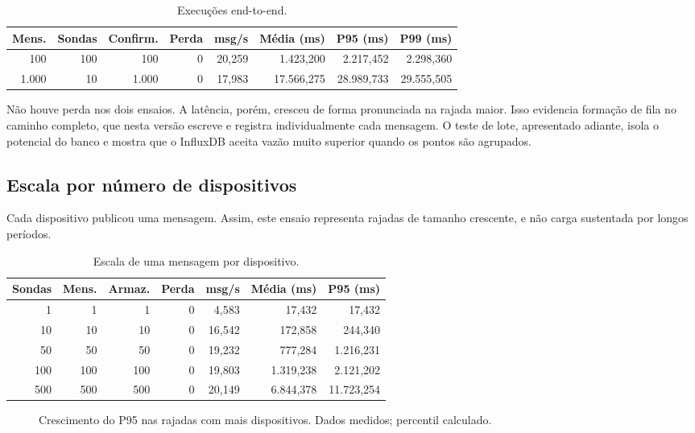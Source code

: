 \documentclass[12pt,a4paper]{article}
\begin{document}
\begin{table}[htbp]
\centering
\caption{Execuções end-to-end.}
\begin{tabular}{rrrrrrrr}
\toprule
Mens. & Sondas & Confirm. & Perda & msg/s & Média (ms) & P95 (ms) & P99 (ms) \\
\midrule
100 & 100 & 100 & 0 & 20,259 & 1.423,200 & 2.217,452 & 2.298,360 \\
1.000 & 10 & 1.000 & 0 & 17,983 & 17.566,275 & 28.989,733 & 29.555,505 \\
\bottomrule
\end{tabular}
\end{table}

Não houve perda nos dois ensaios. A latência, porém, cresceu de forma pronunciada na rajada maior. Isso evidencia formação de fila no caminho completo, que nesta versão escreve e registra individualmente cada mensagem. O teste de lote, apresentado adiante, isola o potencial do banco e mostra que o InfluxDB aceita vazão muito superior quando os pontos são agrupados.

\subsection{Escala por número de dispositivos}

Cada dispositivo publicou uma mensagem. Assim, este ensaio representa rajadas de tamanho crescente, e não carga sustentada por longos períodos.

\begin{table}[htbp]
\centering
\caption{Escala de uma mensagem por dispositivo.}
\begin{tabular}{rrrrrrr}
\toprule
Sondas & Mens. & Armaz. & Perda & msg/s & Média (ms) & P95 (ms) \\
\midrule
1 & 1 & 1 & 0 & 4,583 & 17,432 & 17,432 \\
10 & 10 & 10 & 0 & 16,542 & 172,858 & 244,340 \\
50 & 50 & 50 & 0 & 19,232 & 777,284 & 1.216,231 \\
100 & 100 & 100 & 0 & 19,803 & 1.319,238 & 2.121,202 \\
500 & 500 & 500 & 0 & 20,149 & 6.844,378 & 11.723,254 \\
\bottomrule
\end{tabular}
\end{table}

\begin{figure}[htbp]
\centering
{}
\caption{Crescimento do P95 nas rajadas com mais dispositivos. Dados medidos; percentil calculado.}
\end{figure}
\end{document}
